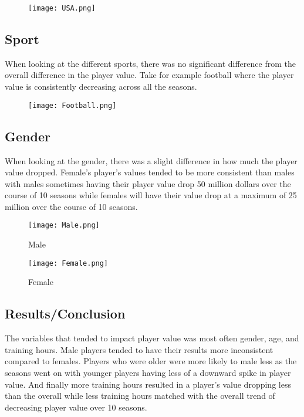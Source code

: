 \documentclass{exam}
\begin{document}
\begin{figure}[h]
\texttt{[image: USA.png]}
\centering
\end{figure}

\newpage
\subsection{Sport}
When looking at the different sports, there was no significant difference from the overall difference in the player value. Take for example football where the player value is consistently decreasing across all the seasons.

\begin{figure}[h]
\texttt{[image: Football.png]}
\centering
\end{figure}

\subsection{Gender}
When looking at the gender, there was a slight difference in how much the player value dropped. Female's player's values tended to be more consistent than males with males sometimes having their player value drop 50 million dollars over the course of 10 seasons while females will have their value drop at a maximum of 25 million over the course of 10 seasons. 

\begin{figure}[h]
  \centering
  \begin{minipage}[b]{0.45\textwidth}
    \texttt{[image: Male.png]}
    \caption{Male}
  \end{minipage}
  \hfill
  \begin{minipage}[b]{0.45\textwidth}
    \texttt{[image: Female.png]}
    \caption{Female}
  \end{minipage}
\end{figure}

\subsection{Results/Conclusion}
The variables that tended to impact player value was most often gender, age, and training hours. Male players tended to have their results more inconsistent compared to females. Players who were older were more likely to male less as the seasons went on with younger players having less of a downward spike in player value. And finally more training hours resulted in a player's value dropping less than the overall while less training hours matched with the overall trend of decreasing player value over 10 seasons.
\end{document}
